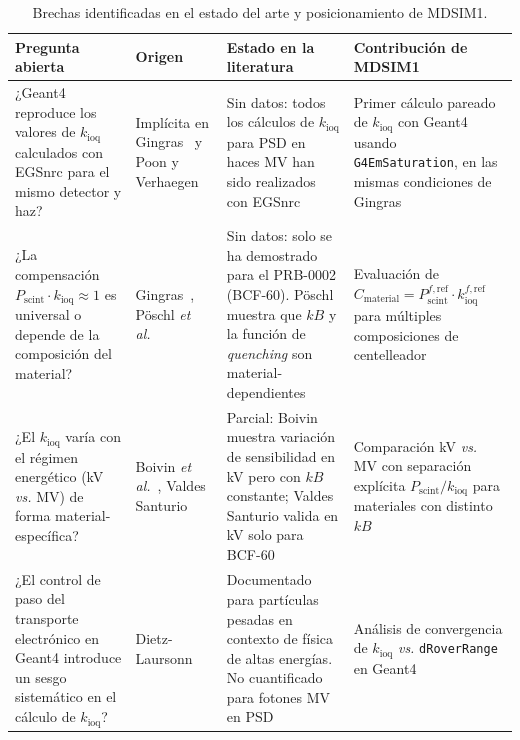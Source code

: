 \documentclass[11pt,a4paper]{article}
\begin{document}

\begin{table}[H]
\centering
\caption{Brechas identificadas en el estado del arte y posicionamiento de MDSIM1.}
\label{tab:brechas}
\small
\begin{tabular}{p{4.2cm} p{3.0cm} p{3.5cm} p{3.5cm}}
\toprule
\textbf{Pregunta abierta} & \textbf{Origen} & \textbf{Estado en la literatura} & \textbf{Contribución de MDSIM1} \\
\midrule
¿Geant4 reproduce los valores de $k_{\mathrm{ioq}}$ calculados con EGSnrc para el mismo detector y haz? &
Implícita en Gingras~\cite{gingras2025} y Poon y Verhaegen~\cite{poon2005} &
Sin datos: todos los cálculos de $k_{\mathrm{ioq}}$ para PSD en haces MV han sido realizados con EGSnrc &
Primer cálculo pareado de $k_{\mathrm{ioq}}$ con Geant4 usando \texttt{G4EmSaturation}, en las mismas condiciones de Gingras \\
\addlinespace
¿La compensación $P_{\mathrm{scint}} \cdot k_{\mathrm{ioq}} \approx 1$ es universal o depende de la composición del material? &
Gingras~\cite{gingras2025}, Pöschl \textit{et al.}~\cite{poeschl2020} &
Sin datos: solo se ha demostrado para el PRB-0002 (BCF-60). Pöschl muestra que $kB$ y la función de \textit{quenching} son material-dependientes &
Evaluación de $C_{\mathrm{material}} = P_{\mathrm{scint}}^{f,\mathrm{ref}} \cdot k_{\mathrm{ioq}}^{f,\mathrm{ref}}$ para múltiples composiciones de centelleador \\
\addlinespace
¿El $k_{\mathrm{ioq}}$ varía con el régimen energético (kV \textit{vs.} MV) de forma material-específica? &
Boivin \textit{et al.}~\cite{boivin2016}, Valdes Santurio~\cite{santurio2020} &
Parcial: Boivin muestra variación de sensibilidad en kV pero con $kB$ constante; Valdes Santurio valida en kV solo para BCF-60 &
Comparación kV \textit{vs.} MV con separación explícita $P_{\mathrm{scint}}/k_{\mathrm{ioq}}$ para materiales con distinto $kB$ \\
\addlinespace
¿El control de paso del transporte electrónico en Geant4 introduce un sesgo sistemático en el cálculo de $k_{\mathrm{ioq}}$? &
Dietz-Laursonn~\cite{ebenau2016} &
Documentado para partículas pesadas en contexto de física de altas energías. No cuantificado para fotones MV en PSD &
Análisis de convergencia de $k_{\mathrm{ioq}}$ \textit{vs.} \texttt{dRoverRange} en Geant4 \\
\bottomrule
\end{tabular}
\end{table}
\end{document}
